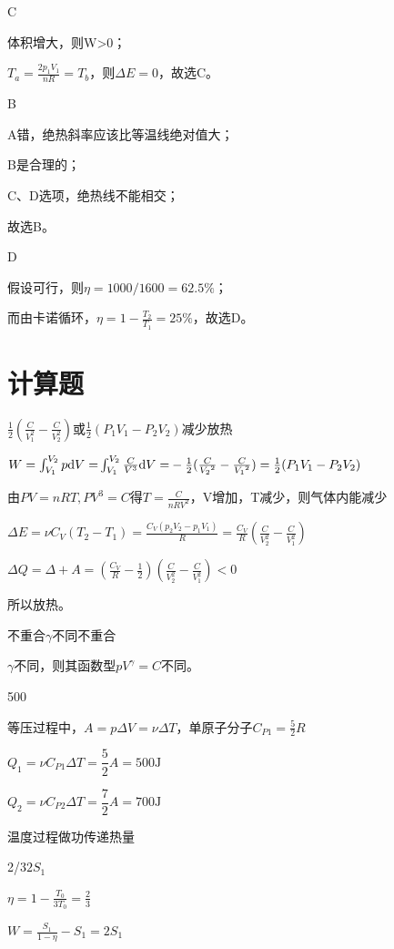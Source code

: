 C

\solve 体积增大，则W>0；

$T_a=\frac{2p_1V_1}{nR}=T_b$，则$\Delta E=0$，故选C。

B

\solve A错，绝热斜率应该比等温线绝对值大；

B是合理的；

C、D选项，绝热线不能相交；

故选B。

D

\solve 假设可行，则$\eta=1000/1600=62.5\%$；

而由卡诺循环，$\eta=1-\frac{T_2}{T_1}=25\%$，故选D。

\section{计算题}
$\frac{1}{2}(\frac{C}{V_1^2}-\frac{C}{V_2^2})$或$\frac{1}{2}(P_1V_1-P_2V_2)$\qquad 减少\qquad 放热

\solve $W = \int_{{V_1}}^{{V_2}} {p\mathrm{d}V = } \int_{V_1}^{V_2}{\frac{C}{{{V^3}}}\mathrm{d}V=}- \frac{1}{2}(\frac{C}{{{V_2}^2}}-\frac{C}{{{V_1}^2}})=\frac{1}{2}(P_1V_1-P_2V_2)$

由$PV = nRT,P{V^3} = C$得$T=\frac{C}{nRV^2}$，V增加，T减少，则气体内能减少

$\Delta E = \nu {C_V}({T_2}-{T_1})= \frac{{{C_V}({p_2}{V_2} - {p_1}{V_1})}}{R} = \frac{C_V}{R}(\frac{C}{V_2^2}-\frac{C}{V_1^2})$

$\Delta Q = \Delta  + A = (\frac{C_V}{R} - \frac{1}{2})(\frac{C}{V_2^2} - \frac{C}{V_1^2}) < 0$

所以放热。

不重合\qquad$\gamma$不同\qquad 不重合

\solve
$\gamma$不同，则其函数型$pV^\gamma=C$不同。

500

\solve 
等压过程中，$A=p\Delta V=\nu \Delta T$，单原子分子$C_{P1}=\frac{5}{2}R$

$Q_1=\nu C_{P1} \Delta T=\dfrac{5}{2}A=500\mathrm{J}$

$Q_2=\nu C_{P2} \Delta T=\dfrac{7}{2}A=700\mathrm{J}$

温度\qquad 过程\qquad 做功\qquad 传递热量

2/3\qquad$2S_1$

\solve
$\eta =1-\frac{T_0}{3T_0}=\frac{2}{3}$

$W=\frac{S_1}{1-\eta}-S_1=2S_1$

